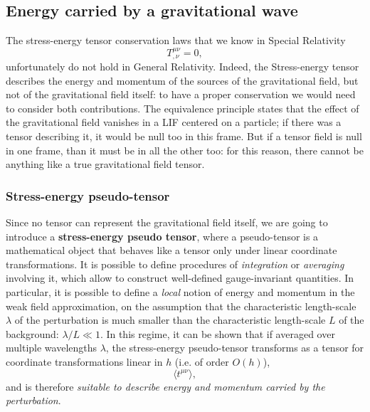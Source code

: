 \subsection{Energy carried by a gravitational wave}
The stress-energy tensor conservation laws that we know in Special Relativity
\[
    T^{\mu\nu}_{,\nu}=0,
\]
unfortunately do not hold in General Relativity.
Indeed, the Stress-energy tensor describes the energy and momentum of the sources of the gravitational field, but not of the gravitational field itself: to have a proper conservation we would need to consider both contributions.
The equivalence principle states that the effect of the gravitational field vanishes in a LIF centered on a particle; if there was a tensor describing it, it would be null too in this frame.
But if a tensor field is null in one frame, than it must be in all the other too: for this reason, there cannot be anything like a true gravitational field tensor.

\subsubsection{Stress-energy pseudo-tensor}
Since no tensor can represent the gravitational field itself, we are going to introduce a \textbf{stress-energy pseudo tensor}, where a pseudo-tensor is a mathematical object that behaves like a tensor only under linear coordinate transformations.
It is possible to define procedures of \textit{integration} or \textit{averaging} involving it, which allow to construct well-defined gauge-invariant quantities.
In particular, it is possible to define a \textit{local} notion of energy and momentum in the weak field approximation, on the assumption that the characteristic length-scale $\lambda$ of the perturbation is much smaller than the characteristic length-scale $L$ of the background: $\lambda/L\ll 1$.
In this regime, it can be shown that if averaged over multiple wavelengths $\lambda$, the stress-energy pseudo-tensor transforms as a tensor for coordinate transformations linear in $h$ (i.e. of order $O(h)$),
\[
    \langle t^{\mu\nu}\rangle,
\]
and is therefore \textit{suitable to describe energy and momentum carried by the perturbation}.


